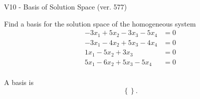 \begin{exercise}
  \begin{exerciseTitle}V10 - Basis of Solution Space (ver. 577)\end{exerciseTitle}
  \begin{exerciseStatement}
    Find a basis for the solution space of the homogeneous system 
\begin{align*}
 -3 x_ 1 + 5 x_ 2 -3 x_ 3 -5 x_ 4 &= 0  \\ 
  -3 x_ 1 -4 x_ 2 + 5 x_ 3 -4 x_ 4 &= 0  \\ 
  1 x_ 1 -5 x_ 2 + 3 x_ 3 &= 0  \\ 
  5 x_ 1 -6 x_ 2 + 5 x_ 3 -5 x_ 4 &= 0  \\ 
 \end{align*}


 
  \end{exerciseStatement}

  \begin{exerciseAnswer}
   A basis is   
\[\left\{\right\}.\]

  


  \end{exerciseAnswer}
\end{exercise}